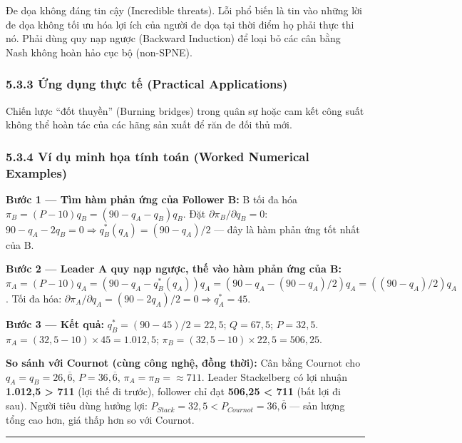 \documentclass[
]{article}
\begin{document}
Đe dọa không đáng tin cậy (Incredible threats). Lỗi phổ biến là tin vào
những lời đe dọa không tối ưu hóa lợi ích của người đe dọa tại thời điểm
họ phải thực thi nó. Phải dùng quy nạp ngược (Backward Induction) để
loại bỏ các cân bằng Nash không hoàn hảo cục bộ (non-SPNE).

\subsubsection{5.3.3 Ứng dụng thực tế (Practical
Applications)}\label{ux1ee9ng-dux1ee5ng-thux1ef1c-tux1ebf-practical-applications-4}

Chiến lược ``đốt thuyền'' (Burning bridges) trong quân sự hoặc cam kết
công suất không thể hoàn tác của các hãng sản xuất để răn đe đối thủ
mới.

\subsubsection{5.3.4 Ví dụ minh họa tính toán (Worked Numerical
Examples)}\label{vuxed-dux1ee5-minh-hux1ecda-tuxednh-touxe1n-worked-numerical-examples-3}

\textbf{Bước 1 --- Tìm hàm phản ứng của Follower B:} B tối đa hóa
\(\pi_B = (P - 10)q_B = (90 - q_A - q_B)q_B\). Đặt
\(\partial \pi_B / \partial q_B = 0\):
\(90 - q_A - 2q_B = 0 \Rightarrow q_B^*(q_A) = (90 - q_A)/2\) --- đây là
hàm phản ứng tốt nhất của B.

\textbf{Bước 2 --- Leader A quy nạp ngược, thế vào hàm phản ứng của B:}
\(\pi_A = (P-10)q_A = (90 - q_A - q_B^*(q_A))q_A = (90 - q_A - (90-q_A)/2)q_A = ((90-q_A)/2)q_A\).
Tối đa hóa:
\(\partial \pi_A / \partial q_A = (90 - 2q_A)/2 = 0 \Rightarrow q_A^* = 45\).

\textbf{Bước 3 --- Kết quả:} \(q_B^* = (90-45)/2 = 22{,}5\);
\(Q = 67{,}5\); \(P = 32{,}5\).
\(\pi_A = (32{,}5-10) \times 45 = 1.012{,}5\);
\(\pi_B = (32{,}5-10) \times 22{,}5 = 506{,}25\).

\textbf{So sánh với Cournot (cùng công nghệ, đồng thời):} Cân bằng
Cournot cho \(q_A = q_B = 26,\overline{6}\), \(P = 36,\overline{6}\),
\(\pi_A = \pi_B = \approx 711\). Leader Stackelberg có lợi nhuận
\textbf{1.012,5 \textgreater{} 711} (lợi thế đi trước), follower chỉ đạt
\textbf{506,25 \textless{} 711} (bất lợi đi sau). Người tiêu dùng hưởng
lợi: \(P_{Stack} = 32{,}5 < P_{Cournot} = 36,\overline{6}\) --- sản
lượng tổng cao hơn, giá thấp hơn so với Cournot.

\begin{center}\rule{0.5\linewidth}{0.5pt}\end{center}
\end{document}
